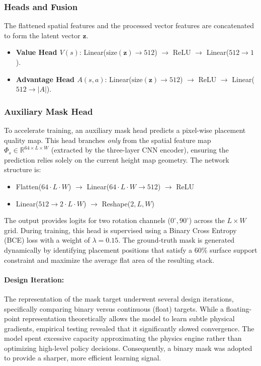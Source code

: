 \documentclass[runningheads]{llncs}
\begin{document}
\subsubsection{Heads and Fusion}
The flattened spatial features and the processed vector features are concatenated to form the latent vector $\mathbf{z}$.
\begin{itemize}
    \item \textbf{Value Head $V(s)$}: Linear($\text{size}(\mathbf{z}) \to 512$) $\to$ ReLU $\to$ Linear($512 \to 1$).
    \item \textbf{Advantage Head $A(s,a)$}: Linear($\text{size}(\mathbf{z}) \to 512$) $\to$ ReLU $\to$ Linear($512 \to |A|$).
\end{itemize}

\subsubsection{Auxiliary Mask Head}
\label{sec:mask} 
To accelerate training, an auxiliary mask head predicts a pixel-wise placement quality map. This head branches \textit{only} from the spatial feature map $\Phi_s \in \mathbb{R}^{64 \times L \times W}$ (extracted by the three-layer CNN encoder), ensuring the prediction relies solely on the current height map geometry. The network structure is:
\begin{itemize}
    \item Flatten($64 \cdot L \cdot W$) $\to$ Linear($64 \cdot L \cdot W \to 512$) $\to$ ReLU
    \item Linear($512 \to 2 \cdot L \cdot W$) $\to$ Reshape($2, L, W$)
\end{itemize}
The output provides logits for two rotation channels ($0^\circ, 90^\circ$) across the $L \times W$ grid. During training, this head is supervised using a Binary Cross Entropy (BCE) loss with a weight of $\lambda=0.15$. The ground-truth mask is generated dynamically by identifying placement positions that satisfy a 60\% surface support constraint and maximize the average flat area of the resulting stack.

\paragraph{Design Iteration:} The representation of the mask target underwent several design iterations, specifically comparing binary versus continuous (float) targets. While a floating-point representation theoretically allows the model to learn subtle physical gradients, empirical testing revealed that it significantly slowed convergence. The model spent excessive capacity approximating the physics engine rather than optimizing high-level policy decisions. Consequently, a binary mask was adopted to provide a sharper, more efficient learning signal.
\end{document}
